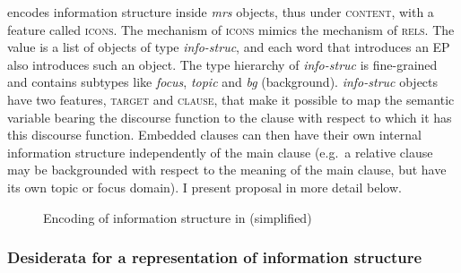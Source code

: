 \citet{Song.2017} encodes information structure inside \emph{mrs} objects, thus under \textsc{content}, with a feature called \textsc{icons}. The mechanism of \textsc{icons} mimics the mechanism of \textsc{rels}. The value is a list of objects of type \emph{info-struc}, and each word that introduces an EP also introduces such an object. The type hierarchy of \emph{info-struc} is fine-grained and contains subtypes like \emph{focus}, \emph{topic} and \emph{bg} (background). \emph{info-struc} objects have two features, \textsc{target} and \textsc{clause}, that make it possible to map the semantic variable bearing the discourse function to the clause with respect to which it has this discourse function. Embedded clauses can then have their own internal information structure independently of the main clause (e.g.\ a relative clause may be backgrounded with respect to the meaning of the main clause, but have its own topic or focus domain). I present  proposal in more detail below.

\begin{figure}[h] 
\caption{Encoding of information structure in \citet[116]{Song.2017} (simplified)}
\end{figure}

\subsubsection{Desiderata for a representation of information structure}

